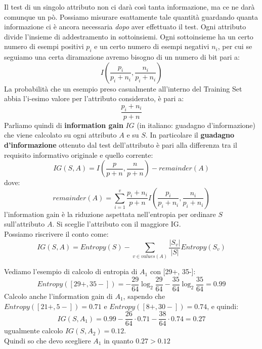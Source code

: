 Il test di un singolo attributo non ci darà così tanta informazione, ma ce ne darà comunque un pò. Possiamo misurare esattamente tale quantità guardando quanta informazione ci è ancora necessaria \textit{dopo} aver effettuato il test. Ogni attributo divide l'insieme di addestramento in sottoinsiemi. Ogni sottoinsieme ha un certo numero di esempi positivi $p_i$ e un certo numero di esempi negativi $n_i$, per cui se seguiamo una certa diramazione avremo bisogno di un numero di bit pari a:
\[I\left(\frac{p_i}{p_i+n_i},\frac{n_i}{p_i+n_i}\right)\]
La probabilità che un esempio preso casualmente all'interno del Training Set abbia l'i-esimo valore per l'attributo considerato, è pari a:
\[\frac{p_i+n_i}{p+n}\]
Parliamo quindi di \textbf{information gain} $IG$ (in italiano: guadagno d'informazione) che viene calcolato su ogni
attributo $A$ e su $S$. In particolare il \textbf{guadagno d'informazione} ottenuto dal test dell'attributo è pari alla differenza tra il requisito informativo originale e quello corrente:
\[IG(S, A)=I\left(\frac{p}{p+n},\frac{n}{p+n}\right)-remainder(A)\]
dove:
\[remainder(A)=\sum_{i=1}^v \frac{p_i+n_i}{p+n}
  I\left(\frac{p_i}{p_i+n_i},\frac{n_i}{p_i+n_i}\right)\]
l'information gain è la riduzione aspettata nell'entropia per ordinare
$S$ sull'attributo $A$. Si sceglie l'attributo con il maggiore IG.\\
Possiamo riscrivere il conto come:
\[IG(S, A)=Entropy(S)-\sum_{v\in values(A)}\frac{|S_v|}{|S|}Entropy(S_v)\]
\begin{esempio}
  Vediamo l'esempio di calcolo di entropia di $A_1$ con [29+, 35-]:
  \[Entropy([29+, 35-])=
    -\frac{29}{64}\log_2\frac{29}{64}-\frac{35}{64}\log_2\frac{35}{64}=0.99\]
  Calcolo anche l'information gain di $A_1$, sapendo che
  $Entropy([21+, 5-])=0.71$ e $Entropy([8+, 30-])=0.74$,
  e quindi:
  \[IG(S, A_1)=0.99-\frac{26}{64}\cdot 0.71-\frac{38}{64}\cdot 0.74=0.27\]
  ugualmente calcolo $IG(S, A_2)=0.12$. \\
  Quindi so che devo scegliere $A_1$ in quanto $0.27 > 0.12$
\end{esempio}
